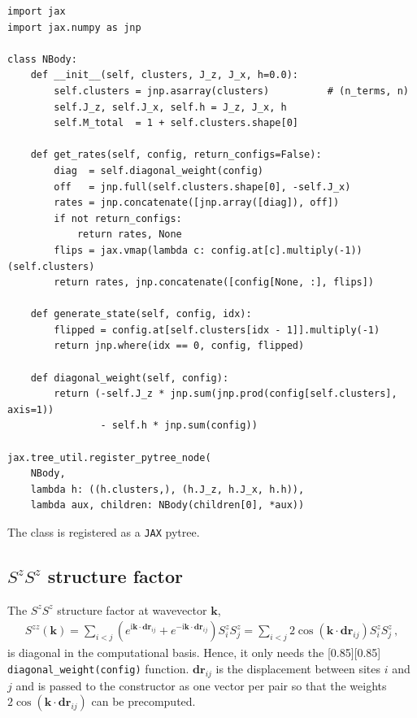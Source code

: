 \documentclass{SciPost}
\newcommand{\pyinline}[1]{\begingroup\setlength{\fboxsep}{0pt}%
  \colorbox{gray!15}{\raisebox{0pt}[0.85\ht\strutbox][0.85\dp\strutbox]{%
    \hspace{1pt}\lstinline{#1}\hspace{1pt}}}\endgroup}
\newcommand{\JAX}{\texttt{JAX}}
\begin{document}
\begin{lstlisting}
import jax
import jax.numpy as jnp

class NBody:
    def __init__(self, clusters, J_z, J_x, h=0.0):
        self.clusters = jnp.asarray(clusters)          # (n_terms, n)
        self.J_z, self.J_x, self.h = J_z, J_x, h
        self.M_total  = 1 + self.clusters.shape[0]

    def get_rates(self, config, return_configs=False):
        diag  = self.diagonal_weight(config)
        off   = jnp.full(self.clusters.shape[0], -self.J_x)
        rates = jnp.concatenate([jnp.array([diag]), off])
        if not return_configs:
            return rates, None
        flips = jax.vmap(lambda c: config.at[c].multiply(-1))(self.clusters)
        return rates, jnp.concatenate([config[None, :], flips])

    def generate_state(self, config, idx):
        flipped = config.at[self.clusters[idx - 1]].multiply(-1)
        return jnp.where(idx == 0, config, flipped)

    def diagonal_weight(self, config):
        return (-self.J_z * jnp.sum(jnp.prod(config[self.clusters], axis=1))
                - self.h * jnp.sum(config))

jax.tree_util.register_pytree_node(
    NBody,
    lambda h: ((h.clusters,), (h.J_z, h.J_x, h.h)),
    lambda aux, children: NBody(children[0], *aux))
\end{lstlisting}
The class is registered as a \JAX{} pytree.

\subsection{$S^zS^z$ structure factor}\label{app:user-defined-observable}
The $S^zS^z$ structure factor at wavevector $\mathbf{k}$,
\begin{align}
	S^{zz}(\mathbf{k}) = \sum_{i<j} \left(e^{\mathrm{i} \mathbf{k}\cdot \mathbf{dr}_{ij}}
	           + e^{-\mathrm{i} \mathbf{k}\cdot \mathbf{dr}_{ij}}\right)S^z_iS^z_j
	           = \sum_{i<j} 2\cos\left( \mathbf{k}\cdot \mathbf{dr}_{ij}\right)S^z_iS^z_j\,,
	\label{eq:user_structure_factor}
\end{align}
is diagonal in the computational basis.
%
Hence, it only needs the \pyinline{diagonal_weight(config)} function.
%
$\mathbf{dr}_{ij}$ is the displacement between sites $i$ and $j$ and is passed to the constructor as one vector per pair so that the weights
$2\cos(\mathbf{k}\cdot\mathbf{dr}_{ij})$ can be precomputed.\\
\end{document}

